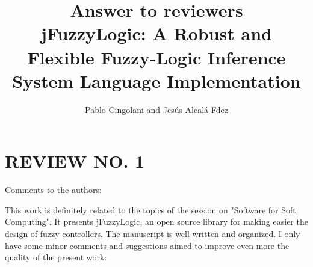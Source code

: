 \documentclass[10pt,a4paper]{article}
\begin{document}
\title{Answer to reviewers \\
jFuzzyLogic: A Robust and Flexible Fuzzy-Logic Inference System Language Implementation
}
\author{Pablo Cingolani and Jes\'us Alcal\'a-Fdez}

\date{}
\maketitle

\section{REVIEW NO. 1}

Comments to the authors:

   This work is definitely related to the topics of the session on "Software for
   Soft Computing". It presents jFuzzyLogic, an open source library for making
   easier the design of fuzzy controllers. The manuscript is well-written and
   organized. I only have some minor comments and suggestions aimed to improve even
   more the quality of the present work:
\end{document}
